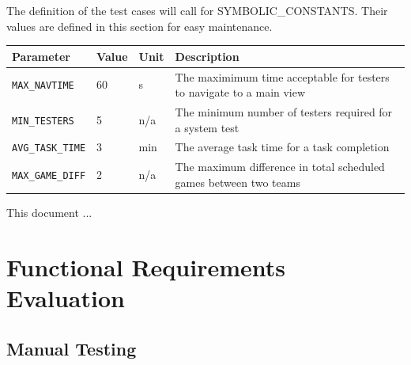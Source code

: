 \documentclass[12pt, titlepage]{article}
\begin{document}
The definition of the test cases will call for SYMBOLIC\_CONSTANTS.
Their values are defined in this section for easy maintenance.
\begin{longtable}{|l|l|l|p{5cm}|}
    \hline
    Parameter & Value & Unit & Description \\
    \hline
    \label{MAX_NAVTIME} \texttt{MAX\_NAVTIME} & 60 & s & The maximimum time acceptable for testers to navigate to a main view \\
    \hline
    \label{MIN_TESTERS} \texttt{MIN\_TESTERS} & 5 & n/a & The minimum number of testers required for a system test \\
    \hline
    \label{AVG_TASK_TIME} \texttt{AVG\_TASK\_TIME} & 3 & min & The average task time for a task completion \\
    \hline
    \label{MAX_GAME_DIFF} \texttt{MAX\_GAME\_DIFF} & 2 & n/a & The maximum difference in total scheduled games between two teams \\
    \hline
\end{longtable}

\newpage

\tableofcontents

\listoftables %

\listoffigures %

\newpage


This document ...

\section{Functional Requirements Evaluation}

\subsection{Manual Testing}
\end{document}
